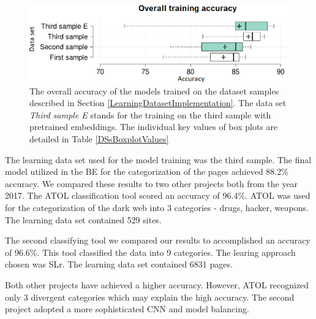  \begin{figure}[t]
    \includegraphics[width =\textwidth]{Images/DSsBoxplot.png}
    \caption{The overall accuracy of the models trained on the dataset samples described in Section \ref{LearningDatasetImplementation}. The data set \textit{Third sample E} stands for the training on the third sample with pretrained embeddings. The individual key values of box plots are detailed in Table \ref{DSsBoxplotValues} }
    \label{DSsBoxplot}
\end{figure}

\FloatBarrier
The learning data set used for the model training was the third sample. The final model utilized in the BE for the categorization of the pages achieved 88.2\% accuracy. We compared these results to two other projects both from the year 2017. The ATOL \cite{atol} classification tool scored an accuracy of 96.4\%. ATOL was used for the categorization of the dark web into 3 categories - drugs, hacker, weapons. The learning data set contained 529 sites. 

The second classifying tool \cite{classificationProject} we compared our results to accomplished an accuracy of 96.6\%. This tool classified the data into 9 categories. The learing approach chosen was SLr. The learning data set contained 6831 pages. 

Both other projects have achieved a higher accuracy. However, ATOL recognized only 3 divergent categories which may explain the high accuracy. The second project adopted a more sophisticated CNN and model balancing. 

